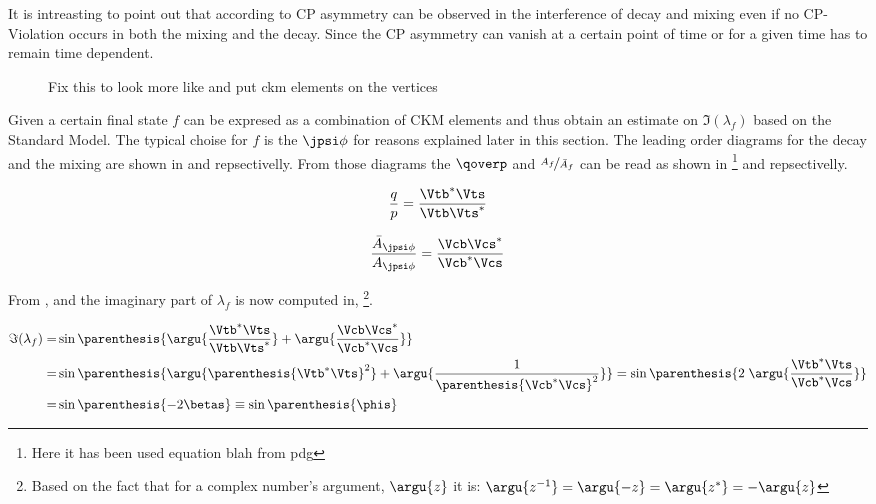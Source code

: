 \noindent It is intreasting to point out that according to  CP asymmetry can be observed in the interference of decay and mixing
even if no CP-Violation occurs in both the mixing and the decay. Since the CP asymmetry can vanish at a certain point of time or for a given time
 has to remain time dependent.

\begin{figure}[h]
  \centering
  {\sffamily }
  \caption{{\color{red} Fix this to look more like  and put ckm elements on the vertices}}
  \label{bs2jpsiphi}
\end{figure}

Given a certain final state $f$  can be expresed as a combination of CKM elements and thus obtain an
estimate on $\Im(\lambda_f)$ based on the Standard Model. The typical choise for $f$ is the $\jpsi\phi$ for reasons
explained later in this section. The leading order diagrams for the \BsJpsiPhi decay and the \BBbarSyst mixing are
shown in  and  repsectivelly. From those diagrams the $\qoverp$ and $\nicefrac{A_f}{\bar{A}_{f}}$
can be read as shown in \footnote{Here it has been used {\color{red} equation blah from pdg} } and  repsectivelly.

\begin{equation}
 \frac{q}{p} = \frac{\Vtb^*\Vts}{\Vtb\Vts^*}
\label{qoverp}
\end{equation}

\begin{equation}
 \frac{\bar{A}_{\jpsi\phi}} {A_{\jpsi\phi}} = \frac{\Vcb\Vcs^*}{\Vcb^*\Vcs}
\label{af_afbar}
\end{equation}

\noindent From ,  and  the imaginary part of $\lambda_{f}$ is now computed in,
\footnote{Based on the fact that for a complex number's argument, $\argu{z}$ it is: $\argu{z^{-1}}=\argu{-z}=\argu{z^*}=-\argu{z}$}.

\begin{align}
 \Im(\lambda_f) =& \sin\parenthesis{ \argu{\frac{\Vtb^*\Vts}{\Vtb\Vts^*}} + \argu{\frac{\Vcb\Vcs^*}{\Vcb^*\Vcs}} } \nonumber \\
                =& \sin\parenthesis{ \argu{\parenthesis{\Vtb^*\Vts}^2}    + \argu{\frac{1}{\parenthesis{\Vcb^*\Vcs}^2}} }
                = \sin\parenthesis{  2 \; \argu{\frac{\Vtb^*\Vts}{\Vcb^*\Vcs}} } \nonumber \\
                =& \sin\parenthesis{-2\betas}
                \equiv \sin\parenthesis{\phis}
 \label{phis_def}
\end{align}

